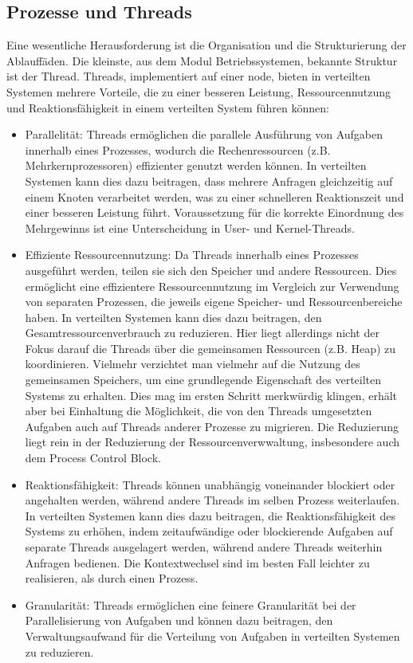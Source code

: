 \documentclass[../vs-script-first-v01.tex]{subfiles}
\begin{document}
\subsection{Prozesse und Threads}
Eine wesentliche Herausforderung ist die Organisation und die Strukturierung der Ablauffäden. Die kleinste, aus dem Modul Betriebssystemen, bekannte Struktur ist der Thread. Threads, implementiert auf einer node, bieten in verteilten Systemen mehrere Vorteile, die zu einer besseren Leistung, Ressourcennutzung und Reaktionsfähigkeit in einem verteilten System führen können:
\begin{itemize}
\item Parallelität: Threads ermöglichen die parallele Ausführung von Aufgaben innerhalb eines Prozesses, wodurch die Rechenressourcen (z.B. Mehrkernprozessoren) effizienter genutzt werden können. In verteilten Systemen kann dies dazu beitragen, dass mehrere Anfragen gleichzeitig auf einem Knoten verarbeitet werden, was zu einer schnelleren Reaktionszeit und einer besseren Leistung führt. Voraussetzung für die korrekte Einordnung des Mehrgewinns ist eine Unterscheidung in User- und Kernel-Threads.
\item Effiziente Ressourcennutzung: Da Threads innerhalb eines Prozesses ausgeführt werden, teilen sie sich den Speicher und andere Ressourcen. Dies ermöglicht eine effizientere Ressourcennutzung im Vergleich zur Verwendung von separaten Prozessen, die jeweils eigene Speicher- und Ressourcenbereiche haben. In verteilten Systemen kann dies dazu beitragen, den Gesamtressourcenverbrauch zu reduzieren. Hier liegt allerdings nicht der Fokus darauf die Threads über die gemeinsamen Ressourcen (z.B. Heap) zu koordinieren. Vielmehr verzichtet man vielmehr auf die Nutzung des gemeinsamen Speichers, um eine grundlegende Eigenschaft des verteilten Systems zu erhalten. Dies mag  im ersten Schritt merkwürdig klingen, erhält aber bei Einhaltung die Möglichkeit, die von den Threads umgesetzten Aufgaben auch auf Threads anderer Prozesse zu migrieren. Die Reduzierung liegt rein in der Reduzierung der Ressourcenverwwaltung, insbesondere auch dem Process Control Block.  

\item Reaktionsfähigkeit: Threads können unabhängig voneinander blockiert oder angehalten werden, während andere Threads im selben Prozess weiterlaufen. In verteilten Systemen kann dies dazu beitragen, die Reaktionsfähigkeit des Systems zu erhöhen, indem zeitaufwändige oder blockierende Aufgaben auf separate Threads ausgelagert werden, während andere Threads weiterhin Anfragen bedienen. Die Kontextwechsel sind im besten Fall leichter zu realisieren, als durch einen Prozess.

\item Granularität: Threads ermöglichen eine feinere Granularität bei der Parallelisierung von Aufgaben und können dazu beitragen, den Verwaltungsaufwand für die Verteilung von Aufgaben in verteilten Systemen zu reduzieren.
\end{itemize}
\end{document}
